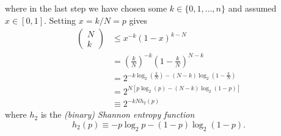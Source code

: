 \documentclass[11pt,letterpaper]{article}
\newcommand{\LP}{\left(}
\newcommand{\RP}{\right)}
\begin{document}
where in the last step we have chosen some $k \in \{0, 1, \ldots, n\}$ and assumed $x \in [0,1]$. Setting $x = k/N = p$ gives \begin{equation}
\begin{aligned}
\begin{pmatrix} N \\ k \end{pmatrix} & \leq x^{-k} (1-x)^{k-N} \\
& = \LP \frac{k}{N} \RP^{-k} \LP 1 - \frac{k}{N} \RP^{N - k} \\
& = 2^{-k \log_2 \LP \frac{k}{N} \RP - (N-k) \log_2 \LP 1 - \frac{k}{N} \RP } \\
& = 2^{N \left[ p \log_2 ( p ) - (N-k) \log_2 \LP 1 - p \RP \right]} \\
& \equiv 2^{-kN h_2(p)}
\end{aligned}
\end{equation}
where $h_2$ is the \textit{(binary) Shannon entropy function} \begin{equation}
h_2(p) \equiv - p \log_2 p - (1-p) \log_2 (1-p).
\end{equation}





\end{document}
